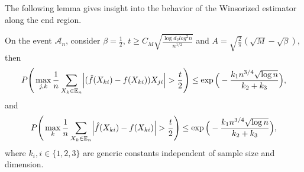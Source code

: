 The following lemma gives insight into the behavior of the Winsorized estimator along the end region.
\begin{lemma}\label{end_region}
    On the event $\mathcal{A}_n$, consider $\beta = \frac{1}{2}$, $t \geq C_M\sqrt{\frac{\log d_2 log^2 n}{n^{1/2}}}$ and $A = \sqrt{\frac{2}{\pi}}(\sqrt{M}- \sqrt{\beta})$, then
    \begin{equation*}
            P\Bigg(\max_{j,k} \frac{1}{n} \sum_{X_k \in \mathbb{E}_n} \abs{(\hat{f}(X_{ki}) - f(X_{ki}))X_{ji}} > \frac{t}{2}\Bigg) \leq \exp\Big(- \frac{k_1 n^{3/4} \sqrt{\log n}}{k_2+ k_3} \Big),
    \end{equation*}
    and
    \begin{equation*}
            P\Bigg(\max_{k} \frac{1}{n} \sum_{X_k \in \mathbb{E}_n} \abs{\hat{f}(X_{ki}) - f(X_{ki})} > \frac{t}{2}\Bigg) \leq \exp\Big(- \frac{k_1 n^{3/4} \sqrt{\log n}}{k_2+ k_3} \Big),
    \end{equation*}
    where $k_i, i \in \{1,2,3\}$ are generic constants independent of sample size and dimension. 
    

\end{lemma}
